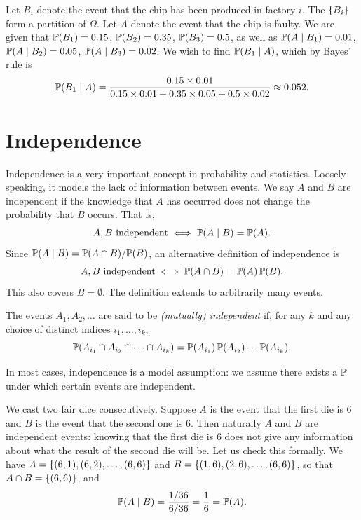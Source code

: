 \begin{solution}
Let $B_i$ denote the event that the chip has been produced in factory $i$. The $\left\{ B_i \right\}$ form a partition of $\Omega$. Let $A$ denote the event that the chip is faulty. We are given that $\mathbb{P}(B_1) = 0.15$, $\mathbb{P}(B_2) = 0.35$, $\mathbb{P}(B_3) = 0.5$, as well as $\mathbb{P}(A \mid B_1) = 0.01$, $\mathbb{P}(A \mid B_2) = 0.05$, $\mathbb{P}(A \mid B_3) = 0.02$. We wish to find $\mathbb{P}(B_1 \mid A)$, which by Bayes' rule is
\[
  \mathbb{P}(B_1 \mid A) = \frac{0.15 \times 0.01}{0.15 \times 0.01 + 0.35 \times 0.05 + 0.5 \times 0.02} \approx 0.052.
\]
\end{solution}

\section{Independence}\label{sec:independence}

Independence is a very important concept in probability and statistics. Loosely speaking, it models the lack of information between events. We say $A$ and $B$ are independent if the knowledge that $A$ has occurred does not change the probability that $B$ occurs. That is,
\[
  A, B \text{ independent} \iff \mathbb{P}(A \mid B) = \mathbb{P}(A).
\]
Since $\mathbb{P}(A \mid B) = \mathbb{P}(A \cap B)/\mathbb{P}(B)$, an alternative definition of independence is
\[
  A, B \text{ independent} \iff \mathbb{P}(A \cap B) = \mathbb{P}(A)\,\mathbb{P}(B).
\]
This also covers $B = \emptyset$. The definition extends to arbitrarily many events.

\begin{definition}\label{def:independent-events}
The events $A_1, A_2, \ldots$ are said to be \emph{(mutually) independent} if, for any $k$ and any choice of distinct indices $i_1, \ldots, i_k$,
\[
  \mathbb{P}(A_{i_1} \cap A_{i_2} \cap \cdots \cap A_{i_k}) = \mathbb{P}(A_{i_1})\,\mathbb{P}(A_{i_2}) \cdots \mathbb{P}(A_{i_k}).
\]
\end{definition}

\begin{remark}\label{rem:independence-model-assumption}
In most cases, independence is a model assumption: we assume there exists a $\mathbb{P}$ under which certain events are independent.
\end{remark}

\begin{example}\label{ex:two-dice-independent}
We cast two fair dice consecutively. Suppose $A$ is the event that the first die is 6 and $B$ is the event that the second one is 6. Then naturally $A$ and $B$ are independent events: knowing that the first die is 6 does not give any information about what the result of the second die will be. Let us check this formally. We have $A = \left\{ (6,1), (6,2), \ldots, (6,6) \right\}$ and $B = \left\{ (1,6), (2,6), \ldots, (6,6) \right\}$, so that $A \cap B = \left\{ (6,6) \right\}$, and
\[
  \mathbb{P}(A \mid B) = \frac{1/36}{6/36} = \frac16 = \mathbb{P}(A).
\]
\end{example}

